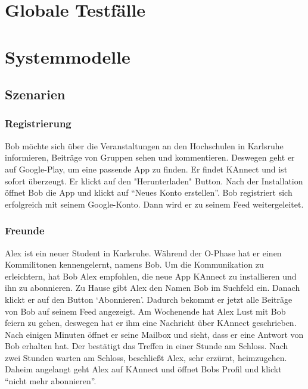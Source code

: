 \documentclass[parskip=full]{scrartcl}
\begin{document}
	\section{Globale Testfälle}
	
	\newpage
	\section{Systemmodelle}
	\subsection{Szenarien}
		\subsubsection{Registrierung}
		Bob möchte sich über die Veranstaltungen an den Hochschulen in Karlsruhe informieren, Beiträge von Gruppen sehen und kommentieren. Deswegen geht er auf Google-Play, um eine passende App zu finden. Er findet KAnnect und ist sofort überzeugt. Er klickt auf den "Herunterladen" Button. Nach der Installation öffnet Bob die App und klickt auf “Neues Konto erstellen”. Bob registriert sich erfolgreich mit seinem Google-Konto. Dann wird er zu seinem \gls{Feed} weitergeleitet.
		
		\subsubsection{Freunde}
		Alex ist ein neuer Student in Karlsruhe.  Während der O-Phase hat er einen Kommilitonen kennengelernt, namens Bob. Um die Kommunikation zu erleichtern, hat Bob Alex empfohlen, die neue App  KAnnect zu installieren und ihn zu abonnieren. Zu Hause gibt Alex den Namen Bob im Suchfeld ein. Danach klickt er auf den Button ‘Abonnieren’. Dadurch bekommt er jetzt alle Beiträge von Bob auf seinem \gls{Feed} angezeigt. Am Wochenende hat Alex Lust mit Bob feiern zu gehen, deswegen hat er ihm eine Nachricht über KAnnect geschrieben. Nach einigen Minuten öffnet er seine Mailbox und sieht, dass er eine Antwort von Bob erhalten hat. Der bestätigt das Treffen in einer Stunde am Schloss. Nach zwei Stunden warten am Schloss, beschließt Alex, sehr erzürnt, heimzugehen. Daheim angelangt geht Alex auf KAnnect und öffnet Bobs Profil und klickt “nicht mehr abonnieren”.
		
\end{document}
